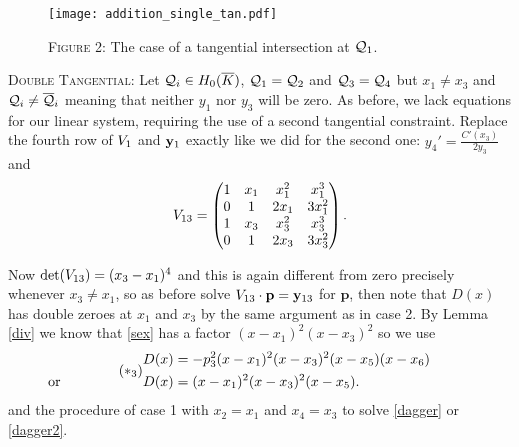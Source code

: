 \documentclass[english,11pt,a4paper]{article}
\begin{document}
\begin{figure}[ht]
  \fline
  \begin{center}
    \vspace{1mm}
    \texttt{[image: addition\_single\_tan.pdf]}

    {\scshape Figure 2}: The case of a tangential intersection at $\mathcal{Q}_1$.%
  \end{center}
  \vspace{-1.5mm}
  \fline
\end{figure}

\begin{case}
  {\scshape Double Tangential:} Let $\mathcal{Q}_i \in H_0(\overline K)$, $\mathcal{Q}_1 = \mathcal{Q}_2$ and $\mathcal{Q}_3 = \mathcal{Q}_4$ but $x_1 \neq x_3$ and $\mathcal{Q}_i \neq \overline {\mathcal{Q}}_i$ meaning that neither $y_1$ nor $y_3$ will be zero. As before, we lack equations for our linear system, requiring the use of a second tangential constraint. Replace the fourth row of $V_1$ and $\mathbf{y}_1$ exactly like we did for the second one: $y_4'=\frac{C'(x_3)}{2 y_3}$ and
  \begin{align*}V_{13}=
    \begin{pmatrix}
      1 & x_1 & x_1^2 & x_1^3\\
      0 & 1 & 2 x_1 & 3 x_1^2\\
      1 & x_3 & x_3^2 & x_3^3\\
      0 & 1 & 2 x_3 & 3 x_3^2\\
    \end{pmatrix}.
  \end{align*}

  Now $\det(V_{13})=(x_3-x_1)^4$ and this is again different from zero precisely whenever $x_3 \neq x_1$, so as before solve $V_{13} \cdot \mathbf{p} = \mathbf{y}_{13}$ for $\mathbf{p}$, then note that $D(x)$ has double zeroes at $x_1$ and $x_3$ by the same argument as in case 2.
  By Lemma \ref{div} we know that \eqref{sex} has a factor $(x-x_1)^2(x-x_3)^2$ so we use
  \begin{align} \tag{$*_3$} \begin{split}
    D(x) &= -p_3^2(x-x_1)^2 (x-x_3)^2 (x-x_5)(x-x_6)\\
    \rlap{\hspace{-25mm} or}
    D(x) &= (x-x_1)^2 (x-x_3)^2 (x-x_5).
  \end{split} \end{align}
  and the procedure of case 1 with $x_2 = x_1$ and $x_4 = x_3$ to solve \eqref{dagger} or \eqref{dagger2}.
\end{case}
\end{document}

